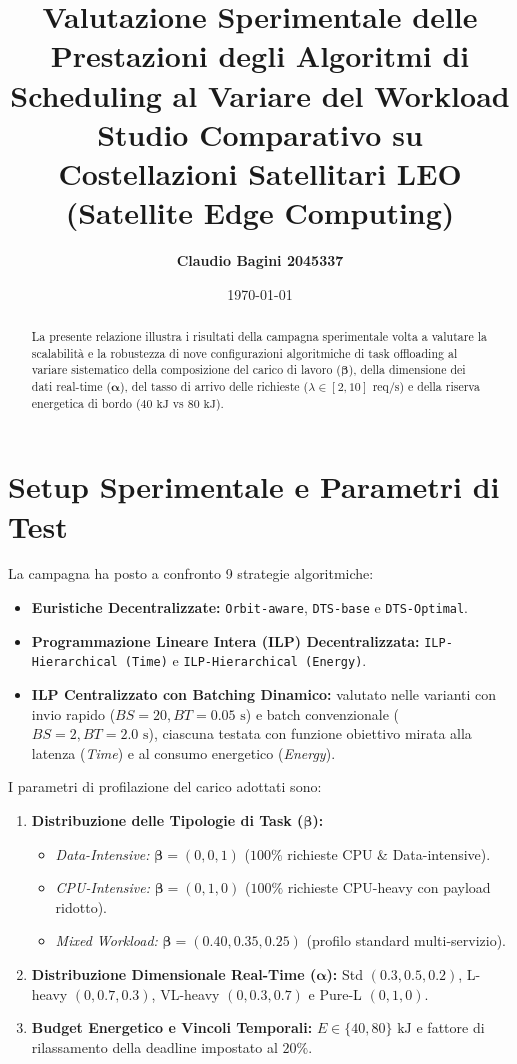 \documentclass[11pt,a4paper]{article}
\title{\textbf{Valutazione Sperimentale delle Prestazioni degli Algoritmi di Scheduling al Variare del Workload}\texorpdfstring{\\ \large Studio Comparativo su Costellazioni Satellitari LEO (Satellite Edge Computing)}{ - Studio Comparativo su Costellazioni Satellitari LEO (Satellite Edge Computing)}}
\author{\textbf{Claudio Bagini 2045337}}
\date{\today}
\begin{document}
\maketitle

\begin{abstract}
La presente relazione illustra i risultati della campagna sperimentale volta a valutare la scalabilità e la robustezza di nove configurazioni algoritmiche di task offloading al variare sistematico della composizione del carico di lavoro ($\boldsymbol{\beta}$), della dimensione dei dati real-time ($\boldsymbol{\alpha}$), del tasso di arrivo delle richieste ($\lambda \in [2, 10]\text{ req/s}$) e della riserva energetica di bordo ($40\text{ kJ}$ vs $80\text{ kJ}$). 
\end{abstract}

\section{Setup Sperimentale e Parametri di Test}
La campagna ha posto a confronto 9 strategie algoritmiche:
\begin{itemize}
    \item \textbf{Euristiche Decentralizzate:} \texttt{Orbit-aware}, \texttt{DTS-base} e \texttt{DTS-Optimal}.
    \item \textbf{Programmazione Lineare Intera (ILP) Decentralizzata:} \texttt{ILP-Hierarchical (Time)} e \texttt{ILP-Hierarchical (Energy)}.
    \item \textbf{ILP Centralizzato con Batching Dinamico:} valutato nelle varianti con invio rapido ($BS=20, BT=0.05\text{ s}$) e batch convenzionale ($BS=2, BT=2.0\text{ s}$), ciascuna testata con funzione obiettivo mirata alla latenza (\textit{Time}) e al consumo energetico (\textit{Energy}).
\end{itemize}

I parametri di profilazione del carico adottati sono:
\begin{enumerate}
    \item \textbf{Distribuzione delle Tipologie di Task ($\boldsymbol{\beta}$):}
    \begin{itemize}
        \item \textit{Data-Intensive:} $\boldsymbol{\beta} = (0, 0, 1)$ ($100\%$ richieste CPU \& Data-intensive).
        \item \textit{CPU-Intensive:} $\boldsymbol{\beta} = (0, 1, 0)$ ($100\%$ richieste CPU-heavy con payload ridotto).
        \item \textit{Mixed Workload:} $\boldsymbol{\beta} = (0.40, 0.35, 0.25)$ (profilo standard multi-servizio).
    \end{itemize}
    \item \textbf{Distribuzione Dimensionale Real-Time ($\boldsymbol{\alpha}$):} Std $(0.3, 0.5, 0.2)$, L-heavy $(0, 0.7, 0.3)$, VL-heavy $(0, 0.3, 0.7)$ e Pure-L $(0, 1, 0)$.
    \item \textbf{Budget Energetico e Vincoli Temporali:} $E \in \{40, 80\}\text{ kJ}$ e fattore di rilassamento della deadline impostato al $20\%$.
\end{enumerate}
\end{document}
